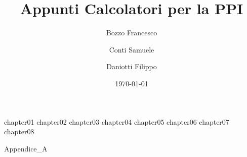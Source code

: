 \documentclass[
	,a4paper
	,12pt
	,oneside
]{book}
\author{Bozzo Francesco \and Conti Samuele \and Daniotti Filippo}
\title{Appunti Calcolatori per la PPI}
\date{\today}
\begin{document}
\frontmatter

	\maketitle
	\tableofcontents

\mainmatter

	{chapter01}
	{chapter02}
	{chapter03}
	{chapter04}
	{chapter05}
	{chapter06} %
	{chapter07}
	{chapter08}

\backmatter

	{Appendice_A}
\end{document}

